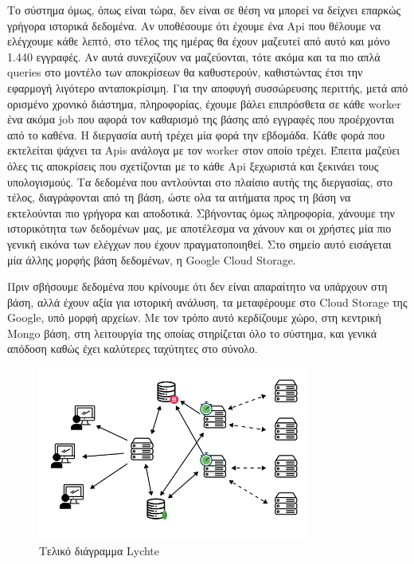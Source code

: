 Το σύστημα όμως, όπως είναι τώρα, δεν είναι σε θέση να μπορεί να δείχνει επαρκώς γρήγορα ιστορικά δεδομένα. Αν υποθέσουμε ότι έχουμε ένα Api που θέλουμε να ελέγχουμε κάθε
λεπτό, στο τέλος της ημέρας θα έχουν μαζευτεί από αυτό και μόνο 1.440 εγγραφές. Αν αυτά συνεχίζουν να μαζεύονται, τότε ακόμα και τα πιο απλά queries στο μοντέλο των αποκρίσεων θα καθυστερούν, καθιστώντας έτσι την εφαρμογή λιγότερο ανταποκρίσιμη.
Για την αποφυγή συσσώρευσης περιττής, μετά από ορισμένο χρονικό διάστημα, πληροφορίας, έχουμε βάλει επιπρόσθετα σε κάθε worker ένα ακόμα job που αφορά
τον καθαρισμό της βάσης από εγγραφές που προέρχονται από το καθένα. Η διεργασία αυτή τρέχει μία φορά την εβδομάδα. Κάθε φορά που εκτελείται ψάχνει τα Apis ανάλογα με τον worker στον οποίο τρέχει.
Έπειτα μαζεύει όλες τις αποκρίσεις που σχετίζονται με το κάθε Api ξεχωριστά και ξεκινάει τους υπολογισμούς. Τα δεδομένα που αντλούνται στο πλαίσιο αυτής της διεργασίας, στο τέλος, διαγράφονται από τη βάση, ώστε ολα τα αιτήματα προς τη βάση
να εκτελούνται πιο γρήγορα και αποδοτικά. Σβήνοντας όμως πληροφορία, χάνουμε την ιστορικότητα των δεδομένων μας, με αποτέλεσμα να χάνουν και οι χρήστες μία πιο γενική εικόνα των ελέγχων που έχουν πραγματοποιηθεί.
Στο σημείο αυτό εισάγεται μία άλλης μορφής βάση δεδομένων, η Google Cloud Storage.

Πριν σβήσουμε δεδομένα που κρίνουμε ότι δεν είναι απαραίτητο να υπάρχουν στη βάση, αλλά έχουν αξία για ιστορική ανάλυση, τα μεταφέρουμε στο Cloud Storage της Google, υπό μορφή αρχείων.
Με τον τρόπο αυτό κερδίζουμε χώρο, στη κεντρική Mongo βάση, στη λειτουργία της οποίας στηρίζεται όλο το σύστημα, και γενικά απόδοση καθώς έχει καλύτερες ταχύτητες στο σύνολο.

\begin{figure}[!ht]
	\centering
	\includegraphics[width=0.8\textwidth]{./images/chapter4/lychte-third-implementation-full.png}
	\caption[Τελικό διάγραμμα Lychte]{Τελικό διάγραμμα Lychte}
	\label{fig:lychte_finalised}
\end{figure}


